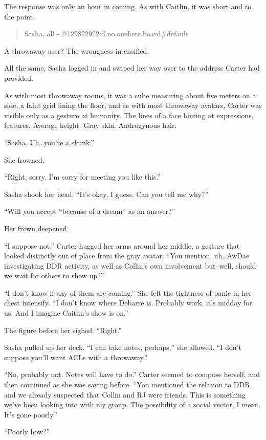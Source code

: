 The response was only an hour in coming. As with Caitlin, it was short and to the point.

\begin{quote}
Sasha, all - @129822922:d.no.onehere.board\#default
\end{quote}

A throwaway user? The wrongness intensified.

All the same, Sasha logged in and swiped her way over to the address Carter had provided.

As with most throwaway rooms, it was a cube measuring about five meters on a side, a faint grid lining the floor, and as with most throwaway avatars, Carter was visible only as a gesture at humanity. The lines of a face hinting at expressions, features. Average height. Gray skin. Androgynous hair.

``Sasha. Uh\ldots{}you're a skunk.''

She frowned.

``Right, sorry. I'm sorry for meeting you like this.''

Sasha shook her head. ``It's okay, I guess. Can you tell me why?''

``Will you accept ``because of a dream'' as an answer?''

Her frown deepened.

``I suppose not.'' Carter hugged her arms around her middle, a gesture that looked distinctly out of place from the gray avatar. ``You mention, uh\ldots{}AwDae investigating DDR activity, as well as Collin's own involvement but--well, should we wait for others to show up?''

``I don't know if any of them are coming.'' She felt the tightness of panic in her chest intensify. ``I don't know where Debarre is. Probably work, it's midday for us. And I imagine Caitlin's show is on.''

The figure before her sighed. ``Right.''

Sasha pulled up her deck. ``I can take notes, perhaps,'' she allowed. ``I don't suppose you'll want ACLs with a throwaway.''

``No, probably not. Notes will have to do.'' Carter seemed to compose herself, and then continued as she was saying before. ``You mentioned the relation to DDR, and we already suspected that Collin and RJ were friends. This is something we've been looking into with my group. The possibility of a social vector, I mean. It's gone poorly.''

``Poorly how?''

